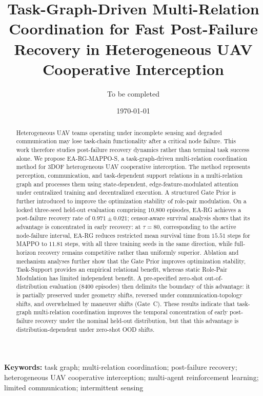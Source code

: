 \documentclass[a4paper,11pt]{article}
\title{Task-Graph-Driven Multi-Relation Coordination for Fast Post-Failure Recovery in Heterogeneous UAV Cooperative Interception}
\author{To be completed}
\date{\today}
\begin{document}
\maketitle

\begin{abstract}
Heterogeneous UAV teams operating under incomplete sensing and degraded communication may lose task-chain functionality after a critical node failure. This work therefore studies post-failure recovery dynamics rather than terminal task success alone. We propose EA-RG-MAPPO-S, a task-graph-driven multi-relation coordination method for 3DOF heterogeneous UAV cooperative interception. The method represents perception, communication, and task-dependent support relations in a multi-relation graph and processes them using state-dependent, edge-feature-modulated attention under centralized training and decentralized execution. A structured Gate Prior is further introduced to improve the optimization stability of role-pair modulation. On a locked three-seed held-out evaluation comprising 10{,}800 episodes, EA-RG achieves a post-failure recovery rate of $0.971 \pm 0.021$; censor-aware survival analysis shows that its advantage is concentrated in early recovery: at $\tau = 80$, corresponding to the active node-failure interval, EA-RG reduces restricted mean survival time from $15.51$ steps for MAPPO to $11.81$ steps, with all three training seeds in the same direction, while full-horizon recovery remains competitive rather than uniformly superior. Ablation and mechanism analyses further show that the Gate Prior improves optimization stability, Task-Support provides an empirical relational benefit, whereas static Role-Pair Modulation has limited independent benefit. A pre-specified zero-shot out-of-distribution evaluation (8400 episodes) then delimits the boundary of this advantage: it is partially preserved under geometry shifts, reversed under communication-topology shifts, and overwhelmed by maneuver shifts (Gate~C). These results indicate that task-graph multi-relation coordination improves the temporal concentration of early post-failure recovery under the nominal held-out distribution, but that this advantage is distribution-dependent under zero-shot OOD shifts.
\end{abstract}

\noindent\textbf{Keywords:} task graph; multi-relation coordination; post-failure recovery; heterogeneous UAV cooperative interception; multi-agent reinforcement learning; limited communication; intermittent sensing











\end{document}
